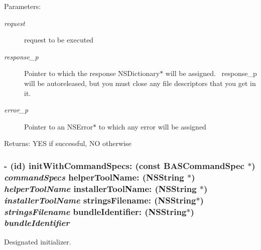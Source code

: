 \begin{Desc}
\item[Parameters:]
\begin{description}
\item[{\em request}]request to be executed \item[{\em response\_\-p}]Pointer to which the response NSDictionary$\ast$ will be assigned.~ response\_\-p will be autoreleased, but you must close any file descriptors that you get in it. \item[{\em error\_\-p}]Pointer to an NSError$\ast$ to which any error will be assigned \end{description}
\end{Desc}
\begin{Desc}
\item[Returns:]YES if successful, NO otherwise \end{Desc}
\hypertarget{class_s_s_y_authorized_task_master_b5e2843812bcad27dd3d89818cc11cef}{
\subsubsection[{initWithCommandSpecs:helperToolName:installerToolName:stringsFilename:bundleIdentifier:}]{\setlength{\rightskip}{0pt plus 5cm}- (id) initWithCommandSpecs: (const {\bf BASCommandSpec} $\ast$) {\em commandSpecs}\/ helperToolName: (NSString $\ast$) {\em helperToolName}\/ installerToolName: (NSString $\ast$) {\em installerToolName}\/ stringsFilename: (NSString$\ast$) {\em stringsFilename}\/ bundleIdentifier: (NSString$\ast$) {\em bundleIdentifier}}}
\label{class_s_s_y_authorized_task_master_b5e2843812bcad27dd3d89818cc11cef}


Designated initializer. 

